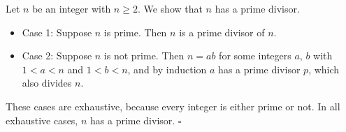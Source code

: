 Let $n$ be an integer with $n \geq 2$.
We show that $n$ has a prime divisor.

\begin{itemize}
  \item Case 1: Suppose $n$ is prime.
    Then $n$ is a prime divisor of $n$.
  \item Case 2: Suppose $n$ is not prime.
    Then $n = ab$ for some integers $a$, $b$ with $1 < a < n$ and $1 < b < n$, and by induction $a$ has a prime divisor $p$, which also divides $n$.
\end{itemize}

These cases are exhaustive, because every integer is either prime or not.
In all exhaustive cases, $n$ has a prime divisor. \hfill$\square$